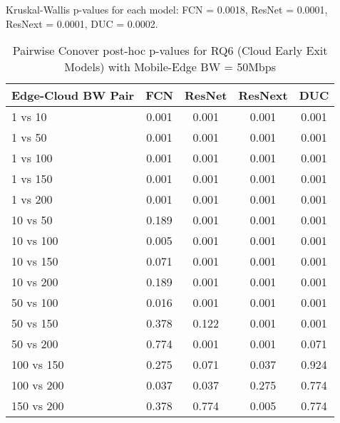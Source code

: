 \begin{table}[h]
\centering
\caption{Pairwise Conover post-hoc p-values for RQ6 (Cloud Early Exit Models) with Mobile-Edge BW = 50Mbps}
\label{tab:conover_cloud_earlyexit_me50}
\smallskip
Kruskal-Wallis p-values for each model: FCN = 0.0018, ResNet = 0.0001, ResNext = 0.0001, DUC = 0.0002.

\begin{tabular}{lcccc}
\toprule
Edge-Cloud BW Pair & FCN & ResNet & ResNext & DUC \\
\midrule
1 vs 10 & 0.001 & 0.001 & 0.001 & 0.001 \\
1 vs 50 & 0.001 & 0.001 & 0.001 & 0.001 \\
1 vs 100 & 0.001 & 0.001 & 0.001 & 0.001 \\
1 vs 150 & 0.001 & 0.001 & 0.001 & 0.001 \\
1 vs 200 & 0.001 & 0.001 & 0.001 & 0.001 \\
10 vs 50 & 0.189 & 0.001 & 0.001 & 0.001 \\
10 vs 100 & 0.005 & 0.001 & 0.001 & 0.001 \\
10 vs 150 & 0.071 & 0.001 & 0.001 & 0.001 \\
10 vs 200 & 0.189 & 0.001 & 0.001 & 0.001 \\
50 vs 100 & 0.016 & 0.001 & 0.001 & 0.001 \\
50 vs 150 & 0.378 & 0.122 & 0.001 & 0.001 \\
50 vs 200 & 0.774 & 0.001 & 0.001 & 0.071 \\
100 vs 150 & 0.275 & 0.071 & 0.037 & 0.924 \\
100 vs 200 & 0.037 & 0.037 & 0.275 & 0.774 \\
150 vs 200 & 0.378 & 0.774 & 0.005 & 0.774 \\
\bottomrule
\end{tabular}
\end{table}

